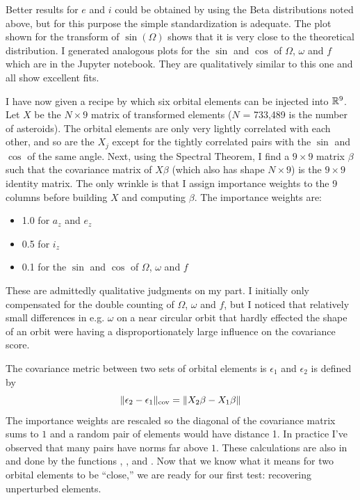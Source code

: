 Better results for $e$ and $i$ could be obtained by using the Beta distributions noted above, but for this purpose the simple standardization is adequate.
The plot shown for the transform of $\sin(\Omega)$ shows that it is very close to the theoretical distribution.
I generated analogous plots for the $\sin$ and $\cos$ of $\Omega$, $\omega$ and $f$ which are in the Jupyter notebook.
They are qualitatively similar to this one and all show excellent fits.

I have now given a recipe by which six orbital elements can be injected into $\mathbb{R}^{9}$.
Let $X$ be the $N \times 9$ matrix of transformed elements ($N$ = 733,489 is the number of asteroids).
The orbital elements are only very lightly correlated with each other, 
and so are the $X_j$ except for the tightly correlated pairs with the $\sin$ and $\cos$ of the same angle.
Next, using the Spectral Theorem, I find a $9 \times 9$ matrix $\beta$ such that the covariance matrix of $X \beta$  
(which also has shape $N \times 9$) is the $9 \times 9$ identity matrix.
The only wrinkle is that I assign importance weights to the 9 columns before building $X$ and computing $\beta$.
The importance weights are:
\begin{itemize}
\item 1.0 for $a_z$ and $e_z$
\item 0.5 for $i_z$
\item 0.1 for the $\sin$ and $\cos$ of $\Omega$, $\omega$ and $f$
\end{itemize}
These are admittedly qualitative judgments on my part. 
I initially only compensated for the double counting of $\Omega$, $\omega$ and $f$, 
but I noticed that relatively small differences in e.g. $\omega$ on a near circular orbit that hardly effected the shape of an orbit
were having a disproportionately large influence on the covariance score.

The covariance metric between two sets of orbital elements is $\epsilon_1$ and $\epsilon_2$ is defined by
$$ \lVert\epsilon_2 - \epsilon_1\rVert_{\mathrm{cov}} = \lVert X_2 \beta - X_1 \beta\rVert $$
The importance weights are rescaled so the diagonal of the covariance matrix sums to $1$ and a random pair of elements would have distance 1.
In practice I've observed that many pairs have norms far above $1$.
These calculations are also in  and done by the 
functions , ,  and .
Now that we know what it means for two orbital elements to be ``close,'' 
we are ready for our first test: recovering unperturbed elements.

